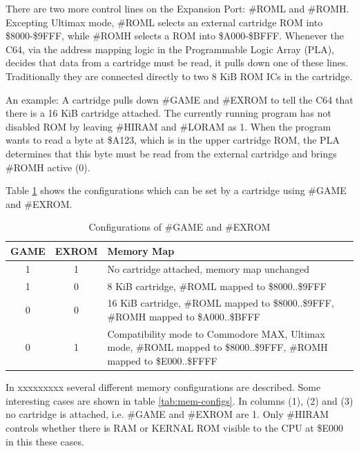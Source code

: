 \documentclass[a4paper]{memoir}
\begin{document}
There are two more control lines on the Expansion Port: \#ROML and
\#ROMH. Excepting Ultimax mode, \#ROML selects an external
cartridge ROM into \$8000-\$9FFF, while \#ROMH selects a ROM into
\$A000-\$BFFF. Whenever the C64, via the address mapping logic in
the Programmable Logic Array (PLA), decides that data from a
cartridge must be read, it pulls down one of these lines.
Traditionally they are connected directly to two 8 KiB ROM ICs in
the cartridge.

An example: A cartridge pulls down \#GAME and \#EXROM to tell the C64
that there is a 16 KiB cartridge attached. The currently running
program has not disabled ROM by leaving \#HIRAM and \#LORAM as 1. When
the program wants to read a byte at \$A123, which is in the upper
cartridge ROM, the PLA determines that this byte must be read from
the external cartridge and brings \#ROMH active (0).

Table \ref {tab:game-exrom} shows the configurations which can be
set by a cartridge using \#GAME and \#EXROM.

\begin{table}
    \centering
    \begin{tabularx}{\textwidth}{ccX}
        \toprule
        GAME & EXROM & Memory Map \\
        \midrule
        1 & 1 & No cartridge attached, memory map unchanged \\[3pt]
        1 & 0 & 8 KiB cartridge, \#ROML mapped to \$8000..\$9FFF \\[3pt]
        0 & 0 & 16 KiB cartridge, \#ROML mapped to \$8000..\$9FFF, \#ROMH mapped to \$A000..\$BFFF \\[3pt]
        0 & 1 & Compatibility mode to Commodore MAX, Ultimax mode,
                \#ROML mapped to \$8000..\$9FFF, \#ROMH mapped to \$E000..\$FFFF \\[3pt]
        \bottomrule
    \end{tabularx}
    \caption{Configurations of \#GAME and \#EXROM}
    \label{tab:game-exrom}
\end{table}

In \cite[Ch.~3]{HS10} xxxxxxxxx several different 
memory configurations are described. Some interesting cases are
shown in table \ref {tab:mem-configs}. In columns (1), (2) and (3) no cartridge is
attached, i.e. \#GAME and \#EXROM are 1. Only \#HIRAM controls
whether there is RAM or KERNAL ROM visible to the CPU at \$E000 in
this these cases.
\end{document}

